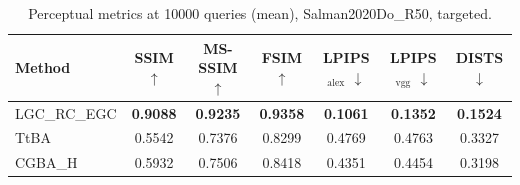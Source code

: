 \begin{table}[t]
\centering\footnotesize
\caption{Perceptual metrics at 10000 queries (mean), Salman2020Do\_R50, targeted.}
\begin{tabular}{lcccccc}
\toprule
Method & SSIM $\uparrow$ & MS-SSIM $\uparrow$ & FSIM $\uparrow$ & LPIPS$_{\mathrm{alex}}$ $\downarrow$ & LPIPS$_{\mathrm{vgg}}$ $\downarrow$ & DISTS $\downarrow$ \\
\midrule
LGC\_RC\_EGC & \textbf{0.9088} & \textbf{0.9235} & \textbf{0.9358} & \textbf{0.1061} & \textbf{0.1352} & \textbf{0.1524} \\
TtBA & 0.5542 & 0.7376 & 0.8299 & 0.4769 & 0.4763 & 0.3327 \\
CGBA\_H & 0.5932 & 0.7506 & 0.8418 & 0.4351 & 0.4454 & 0.3198 \\
\bottomrule
\end{tabular}
\end{table}
